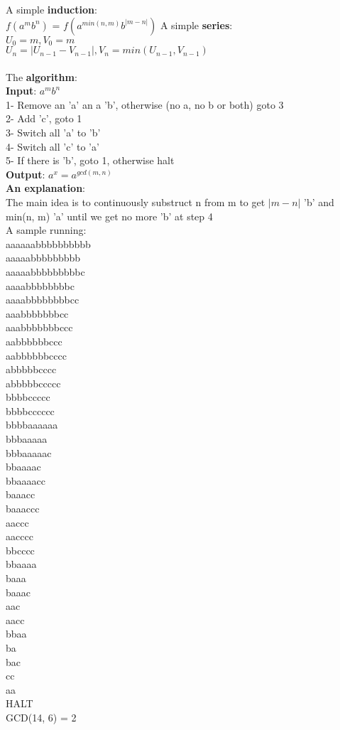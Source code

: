 \documentclass{article}
\begin{document}
\noindent A simple \textbf{induction}:\\
$f(a^mb^n)$ = $f(a^{min(n, m)}b^{|m - n|})$
A simple \textbf{series}:\\
$U_0  = m, V_0 = m$\\
$U_n = |U_{n-1} - V_{n-1}|, V_n = min(U_{n-1}, V_{n-1})$\\\\
The \textbf{algorithm}:\\
\textbf{Input}: $a^mb^n$\\
1- Remove an 'a' an a 'b', otherwise (no a, no b or both) goto 3\\
2- Add 'c', goto 1\\
3- Switch all 'a' to 'b'\\
4- Switch all 'c' to 'a'\\
5- If there is 'b', goto 1, otherwise halt\\
\textbf{Output}: $a^x = a^{gcd(m, n)}$\\

\textbf{An explanation}:\\
The main idea is to continuously substruct n from m to get $|m - n|$ 'b'
 and  min(n, m) 'a'  until we get no more 'b' at step 4\\


 \noindent A sample running:\\
aaaaaabbbbbbbbbb\\
aaaaabbbbbbbbb\\
aaaaabbbbbbbbbc\\
aaaabbbbbbbbc\\
aaaabbbbbbbbcc\\
aaabbbbbbbcc\\
aaabbbbbbbccc\\
aabbbbbbccc\\
aabbbbbbcccc\\
abbbbbcccc\\
abbbbbccccc\\
bbbbccccc\\
bbbbcccccc\\
bbbbaaaaaa\\
bbbaaaaa\\
bbbaaaaac\\
bbaaaac\\
bbaaaacc\\
baaacc\\
baaaccc\\
aaccc\\
aacccc\\
bbcccc\\
bbaaaa\\
baaa\\
baaac\\
aac\\
aacc\\
bbaa\\
ba\\
bac\\
cc\\
aa\\
HALT\\
GCD(14, 6) = 2
\end{document}
